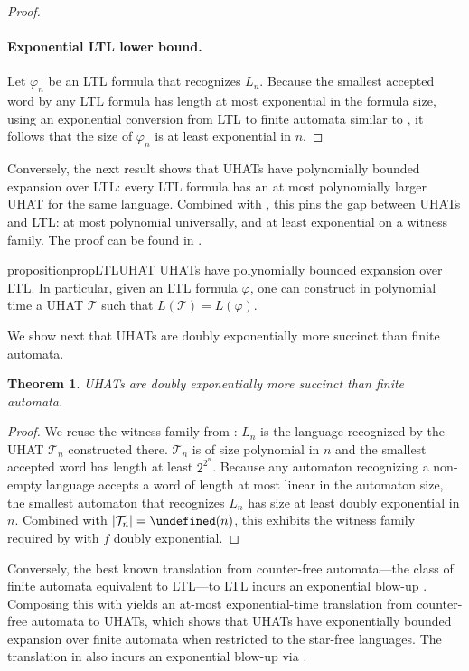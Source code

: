 \documentclass{article} %
\newtheorem{theorem}{Theorem}
\let\poly\undefined
\DeclareMathOperator{\poly}{poly}
\newcommand{\trans}{\mathcal{T}}
\newcommand{\Lang}{L}
\begin{document}
\begin{proof}
\paragraph{Exponential LTL lower bound.}
Let $\varphi_n$ be an LTL formula that recognizes $L_n$.
Because the smallest accepted word by any LTL formula has length at most exponential in the formula size, using an exponential conversion from LTL to finite automata similar to \citet{VardiW94},
it follows that the size of $\varphi_n$ is at least exponential in $n$.
\end{proof}

Conversely, the next result shows that UHATs have polynomially bounded expansion over LTL: every LTL formula has an at most polynomially larger UHAT for the same language. Combined with , this pins the gap between UHATs and LTL: at most polynomial universally, and at least exponential on a witness family.
The proof can be found in .

\begin{restatable}[]{proposition}{propLTLUHAT}\label{lem:ltl-uhat}
UHATs have polynomially bounded expansion over LTL.
In particular, given an LTL formula $\varphi$, one can construct in polynomial time a UHAT $\trans$ such that $\Lang(\trans) = \Lang(\varphi)$.
\end{restatable}



We show next that UHATs are doubly exponentially more succinct than finite automata.

\begin{theorem}\label{thm:automata-succinct}
UHATs are doubly exponentially more succinct than finite automata.
\end{theorem}
\begin{proof}
We reuse the witness family from : $\Lang_n$ is the language recognized by the UHAT $\trans_n$ constructed there.
$\trans_n$ is of size polynomial in $n$ and the smallest accepted word has length at least $2^{2^n}$.
Because any automaton recognizing a non-empty language accepts a word of length at most linear in the automaton size,
the smallest automaton that recognizes $\Lang_n$ has size at least doubly exponential in $n$.
Combined with $|\trans_n| = \poly(n)$, this exhibits the witness family required by  with $f$ doubly exponential.
\end{proof}

Conversely, the best known translation from counter-free automata---the class of finite automata equivalent to LTL---to LTL incurs an exponential blow-up \citep{MalerP90}. Composing this with  yields an at-most exponential-time translation from counter-free automata to UHATs, which shows that UHATs have exponentially bounded expansion over finite automata when restricted to the star-free languages. 
The translation in \citet{YangCA24} also incurs an exponential blow-up via \citet{MalerP90}.
\end{document}
